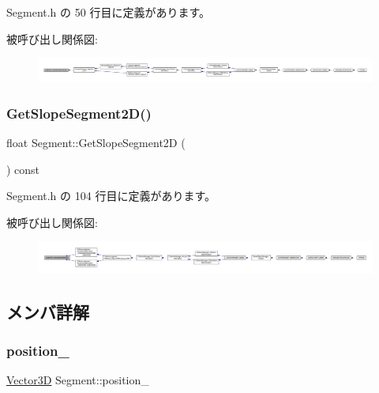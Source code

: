  Segment.\+h の 50 行目に定義があります。

被呼び出し関係図\+:
\nopagebreak
\begin{figure}[H]
\begin{center}
\leavevmode
\includegraphics[width=350pt]{class_segment_a4223e990a42cc9e487ef51b82e63e777_icgraph}
\end{center}
\end{figure}
\mbox{\label{class_segment_a889d62f6d4c10701464726da706ae043}} 
\subsubsection{\texorpdfstring{Get\+Slope\+Segment2\+D()}{GetSlopeSegment2D()}}
{\footnotesize\ttfamily float Segment\+::\+Get\+Slope\+Segment2D (\begin{DoxyParamCaption}{ }\end{DoxyParamCaption}) const\hspace{0.3cm}{\ttfamily [inline]}}



 Segment.\+h の 104 行目に定義があります。

被呼び出し関係図\+:
\nopagebreak
\begin{figure}[H]
\begin{center}
\leavevmode
\includegraphics[width=350pt]{class_segment_a889d62f6d4c10701464726da706ae043_icgraph}
\end{center}
\end{figure}


\subsection{メンバ詳解}
\mbox{\label{class_segment_aee447b161d940d22e9aa222091789e08}} 
\subsubsection{\texorpdfstring{position\+\_\+}{position\_}}
{\footnotesize\ttfamily \mbox{\hyperlink{class_vector3_d}{Vector3D}} Segment\+::position\+\_\+}




